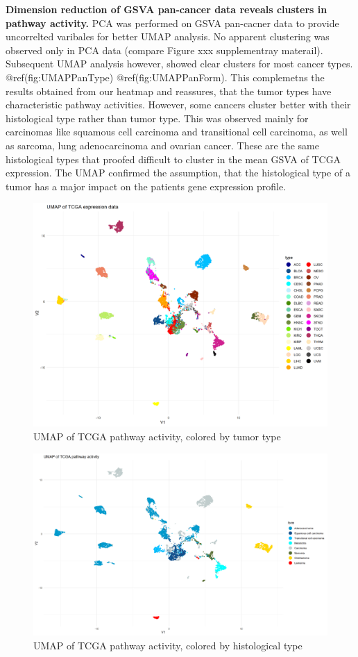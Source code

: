 \documentclass[
]{article}
\begin{document}
\textbf{Dimension reduction of GSVA pan-cancer data reveals clusters in
pathway activity.} PCA was performed on GSVA pan-cacner data to provide
uncorrelted varibales for better UMAP analysis. No apparent clustering
was observed only in PCA data (compare Figure xxx supplementray
materail). Subsequent UMAP analysis however, showed clear clusters for
most cancer types. @ref(fig:UMAPPanType) @ref(fig:UMAPPanForm). This
complemetns the results obtained from our heatmap and reassures, that
the tumor types have characteristic pathway activities. However, some
cancers cluster better with their histological type rather than tumor
type. This was observed mainly for carcinomas like squamous cell
carcinoma and transitional cell carcinoma, as well as sarcoma, lung
adenocarcinoma and ovarian cancer. These are the same histological types
that proofed difficult to cluster in the mean GSVA of TCGA expression.
The UMAP confirmed the assumption, that the histological type of a tumor
has a major impact on the patients gene expression profile.

\begin{figure}

{\centering \includegraphics[width=0.8\linewidth]{figures/Pan Cancer UMAP} 

}

\caption{UMAP of TCGA pathway activity, colored by tumor type}\label{fig:UMAPPanType}
\end{figure}
\begin{figure}

{\centering \includegraphics[width=0.8\linewidth]{figures/Pan Cancer UMAP cancer form} 

}

\caption{UMAP of TCGA pathway activity, colored by histological type}\label{fig:UMAPPanForm}
\end{figure}
\end{document}
